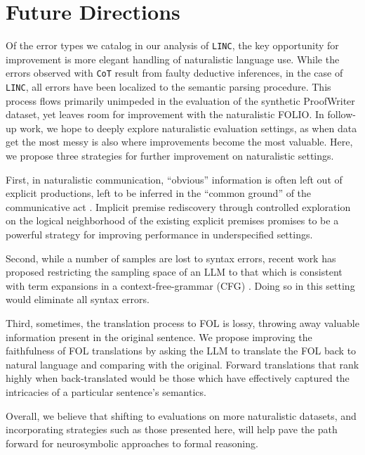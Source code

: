\section{Future Directions}
\label{appendix:fw}

Of the error types we catalog in our analysis of \texttt{LINC}, the key opportunity for improvement is more elegant handling of naturalistic language use.
While the errors observed with \texttt{CoT} result from faulty deductive inferences, in the case of \texttt{LINC}, all errors have been localized to the semantic parsing procedure.
This process flows primarily unimpeded in the evaluation of the synthetic ProofWriter dataset, yet leaves room for improvement with the naturalistic FOLIO. 
In follow-up work, we hope to deeply explore naturalistic evaluation settings, as when data get the most messy is also where improvements become the most valuable. 
Here, we propose three strategies for further improvement on naturalistic settings.

First, in naturalistic communication, ``obvious'' information is often left out of explicit productions, left to be inferred in the ``common ground'' of the communicative act \citep{grice1975logic,stalnaker2002common}. 
Implicit premise rediscovery through controlled exploration on the logical neighborhood of the existing explicit premises promises to be a powerful strategy for improving performance in underspecified settings.

Second, while a number of samples are lost to syntax errors, recent work has proposed restricting the sampling space of an LLM to that which is consistent with term expansions in a context-free-grammar (CFG) \citep{poesia2022synchromesh}.
Doing so in this setting would eliminate all syntax errors.

Third, sometimes, the translation process to FOL is lossy, throwing away valuable information present in the original sentence.
We propose improving the faithfulness of FOL translations by asking the LLM to translate the FOL back to natural language and comparing with the original.
Forward translations that rank highly when back-translated would be those which have effectively captured the intricacies of a particular sentence's semantics.

Overall, we believe that shifting to evaluations on more naturalistic datasets, and incorporating strategies such as those presented here, will help pave the path forward for neurosymbolic approaches to formal reasoning.